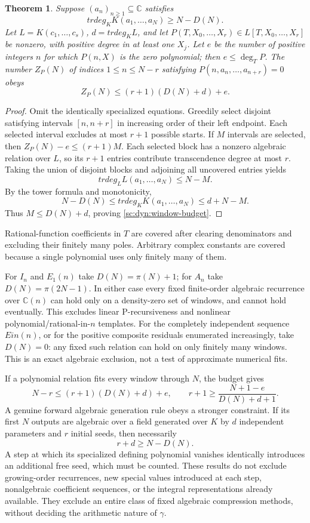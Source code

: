 \documentclass[11pt,a4paper]{article}
\newtheorem{theorem}{Theorem}[section]
\theoremstyle{definition}
\theoremstyle{remark}
\theoremstyle{plain}
\numberwithin{equation}{section}
\def\operatorname#1{#1}\def\mathrm#1{#1}}
\begin{document}
\begin{theorem}\label{sc:dyn:window}
Suppose $(a_n)_{n\ge1}\subseteq\mathbb C$ satisfies
\[
 \operatorname{trdeg}_K K(a_1,\ldots,a_N)\ge N-D(N).
\]
Let $L=K(c_1,\ldots,c_s)$, $d=\operatorname{trdeg}_K L$, and let
$P(T,X_0,\ldots,X_r)\in L[T,X_0,\ldots,X_r]$ be nonzero, with
positive degree in at least one $X_j$. Let $e$ be the number of
positive integers $n$ for which $P(n,X)$ is the zero polynomial;
then $e\le\deg_TP$. The number $Z_P(N)$ of indices $1\le n\le N-r$
satisfying $P(n,a_n,\ldots,a_{n+r})=0$ obeys
\begin{equation}\label{sc:dyn:window-budget}
 Z_P(N)\le(r+1)(D(N)+d)+e.
\end{equation}
\end{theorem}
\begin{proof}
Omit the identically specialized equations. Greedily select disjoint
satisfying intervals $[n,n+r]$ in increasing order of their left
endpoint. Each selected interval excludes at most $r+1$ possible
starts. If $M$ intervals are selected, then
$Z_P(N)-e\le(r+1)M$.
Each selected block has a nonzero algebraic relation over $L$, so its
$r+1$ entries contribute transcendence degree at most $r$. Taking the
union of disjoint blocks and adjoining all uncovered entries yields
\[
 \operatorname{trdeg}_L L(a_1,\ldots,a_N)\le N-M.
\]
By the tower formula and monotonicity,
\[
 N-D(N)\le\operatorname{trdeg}_K K(a_1,\ldots,a_N)
       \le d+N-M.
\]
Thus $M\le D(N)+d$, proving \eqref{sc:dyn:window-budget}.
\end{proof}
Rational-function coefficients in $T$ are covered after clearing
denominators and excluding their finitely many poles. Arbitrary
complex constants are covered because a single polynomial uses only
finitely many of them.

For $I_n$ and $E_1(n)$ take $D(N)=\pi(N)+1$; for $A_n$ take
$D(N)=\pi(2N-1)$. In either case every fixed finite-order algebraic
recurrence over $\mathbb C(n)$ can hold only on a density-zero set of
windows, and cannot hold eventually. This excludes linear
P-recursiveness and nonlinear polynomial/rational-in-$n$ templates.
For the completely independent sequence $\operatorname{Ein}(n)$, or
for the positive composite residuals enumerated increasingly, take
$D(N)=0$: any fixed such relation can hold on only finitely many
windows. This is an exact algebraic exclusion, not a test of approximate
numerical fits.

If a polynomial relation fits every window through $N$, the budget gives
\[
 N-r\le(r+1)(D(N)+d)+e,
 \qquad r+1\ge\frac{N+1-e}{D(N)+d+1}.
\]
A genuine forward algebraic generation rule obeys a stronger constraint.
If its first $N$ outputs are algebraic over a field generated over $K$
by $d$ independent parameters and $r$ initial seeds, then necessarily
\[
 r+d\ge N-D(N).
\]
A step at which its specialized defining polynomial vanishes
identically introduces an additional free seed, which must be counted.
These results do not exclude growing-order recurrences, new special
values introduced at each step, nonalgebraic coefficient sequences, or
the integral representations already available. They exclude an entire
class of fixed algebraic compression methods, without deciding the
arithmetic nature of $\gamma$.
\end{document}
